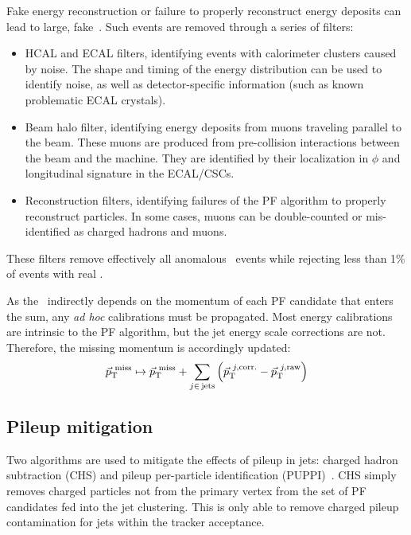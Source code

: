 Fake energy reconstruction or failure to properly reconstruct energy deposits can lead to large, fake~\ptmiss.
Such events are removed through a series of filters:
\begin{itemize}
    \item HCAL and ECAL filters, identifying events with calorimeter clusters caused by noise. 
            The shape and timing of the energy distribution can be used to identify noise, as well as detector-specific information (such as known problematic ECAL crystals).
    \item Beam halo filter, identifying energy deposits from muons traveling parallel to the beam. 
          These muons are produced from pre-collision interactions between the beam and the machine.
          They are identified by their localization in $\phi$ and longitudinal signature in the ECAL/CSCs.
    \item Reconstruction filters, identifying failures of the PF algorithm to properly reconstruct particles.
          In some cases, muons can be double-counted or mis-identified as charged hadrons and muons.
\end{itemize}
These filters remove effectively all anomalous \ptmiss~events while rejecting less than 1\% of events with real \ptmiss. 

As the \ptmiss~indirectly depends on the momentum of each PF candidate that enters the sum, any \emph{ad hoc} calibrations must be propagated.
Most energy calibrations are intrinsic to the PF algorithm, but the jet energy scale corrections are not.
Therefore, the missing momentum is accordingly updated:
\begin{equation}
    \vec{p}_\mathrm{T}^{~\mathrm{miss}} \mapsto \vec{p}_\mathrm{T}^{~\mathrm{miss}}  + \sum_{j\in\,\mathrm{jets}} \left(\vec{p}_\mathrm{T}^{~j,\mathrm{corr.}} - \vec{p}_\mathrm{T}^{~j,\mathrm{raw}}\right) 
\end{equation}

\subsection{Pileup mitigation}

Two algorithms are used to mitigate the effects of pileup in jets: charged hadron subtraction (CHS) and pileup per-particle identification (PUPPI)~\cite{puppi}.
CHS simply removes charged particles not from the primary vertex from the set of PF candidates fed into the jet clustering.
This is only able to remove charged pileup contamination for jets within the tracker acceptance.

